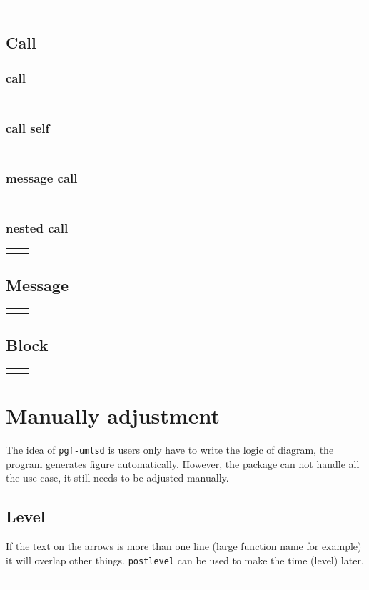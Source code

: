 \documentclass{article}
\newcommand{\demo}[2][1]{
  \begin{center}
  \begin{tabular}{cc}
    \begin{minipage}{.49\linewidth}
      \centering
      \resizebox{#1\linewidth}{!}{
        
      }
    \end{minipage}
    &
    \begin{minipage}{.45\linewidth}
      
    \end{minipage}
  \end{tabular}
  \end{center}
}
\begin{document}
\demo{customize}


\subsection{Call}
\subsubsection{call}
\demo[0.6]{call}

\subsubsection{call self}
\demo[0.6]{callself}

\subsubsection{message call}
\demo[0.6]{messcall}

\subsubsection{nested call}
\demo[0.6]{nested-call}

\subsection{Message}
\demo[0.6]{message}

\subsection{Block}
\demo[0.6]{block}

\section{Manually adjustment}
The idea of \texttt{pgf-umlsd} is users only have to write the logic
of diagram, the program generates figure automatically. However, the
package can not handle all the use case, it still needs to be adjusted
manually.

\subsection{Level}
If the text on the arrows is more than one line (large function name
for example) it will overlap other things. \texttt{postlevel} can be
used to make the time (level) later.

\demo[0.6]{postlevel}
\end{document}
